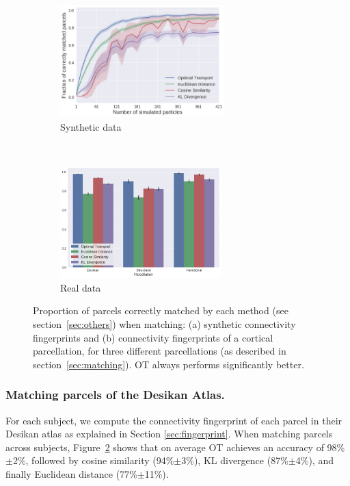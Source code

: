 
\begin{figure}[t!]
    \centering
    \begin{subfigure}[t]{0.52\textwidth}
        \centering
        \includegraphics[height=1.7in]{6.matching/img/synthetic}
        \caption{{\scriptsize Synthetic data}}
        \label{fig:synth}
    \end{subfigure}%
    ~ 
    \begin{subfigure}[t]{0.52\textwidth}
        \centering
        \includegraphics[height=1.7in]{6.matching/img/real}
        \caption{{\scriptsize Real data}}
        \label{fig:real}
    \end{subfigure}
    \caption{Proportion of parcels correctly matched by each method (see section~\ref{sec:others}) when matching: (a) synthetic connectivity fingerprints and (b) connectivity fingerprints of a cortical parcellation, for three different parcellations (as described in section~\ref{sec:matching}). OT always performs significantly better.}
    \label{fig:results}
\end{figure}

\subsubsection{Matching parcels of the Desikan Atlas.}
For each subject, we compute the connectivity fingerprint of each parcel in their Desikan atlas as explained in Section \ref{sec:fingerprint}. When matching parcels across subjects, Figure~\ref{fig:real} shows that on average OT achieves an accuracy of 98\%$\pm$2\%, followed by cosine similarity (94\%$\pm$3\%), KL divergence (87\%$\pm$4\%), and finally Euclidean distance (77\%$\pm$11\%).

